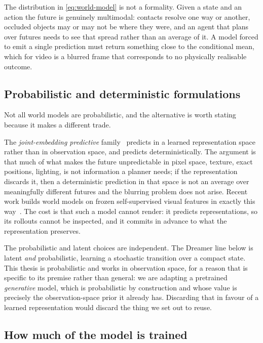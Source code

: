 The distribution in \cref{eq:world-model} is not a formality. Given a state
and an action the future is genuinely multimodal: contacts resolve one way
or another, occluded objects may or may not be where they were, and an
agent that plans over futures needs to see that spread rather than an
average of it. A model forced to emit a single prediction must return
something close to the conditional mean, which for video is a blurred frame
that corresponds to no physically realisable outcome.

\subsection{Probabilistic and deterministic formulations}

Not all world models are probabilistic, and the alternative is worth stating
because it makes a different trade.

The \emph{joint-embedding predictive} family~\citep{lecun2022path} predicts
in a learned representation space rather than in observation space, and
predicts deterministically. The argument is that much of what makes the
future unpredictable in pixel space, texture, exact positions, lighting, is
not information a planner needs; if the representation discards it, then a
deterministic prediction in that space is not an average over meaningfully
different futures and the blurring problem does not arise. Recent work
builds world models on frozen self-supervised visual features in exactly
this way~\citep{dinowm}. The cost is that such a model cannot render:
it predicts representations, so its rollouts cannot be inspected, and it
commits in advance to what the representation preserves.

The probabilistic and latent choices are independent. The Dreamer line
below is latent \emph{and} probabilistic, learning a stochastic transition
over a compact state. This thesis is probabilistic and works in observation
space, for a reason that is specific to its premise rather than general: we
are adapting a pretrained \emph{generative} model, which is probabilistic by
construction and whose value is precisely the observation-space prior it
already has. Discarding that in favour of a learned representation would
discard the thing we set out to reuse.

\subsection{How much of the model is trained}

